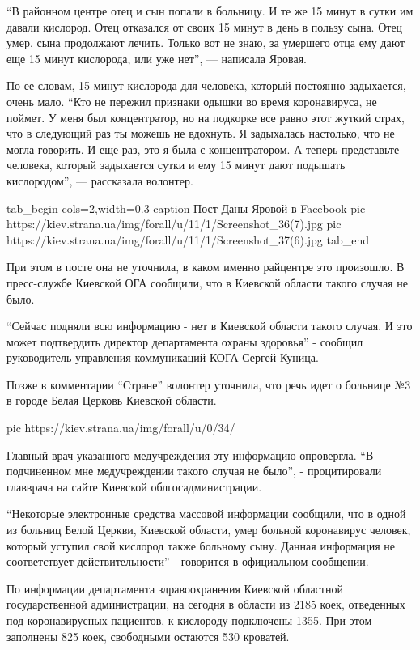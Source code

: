 \enquote{В районном центре отец и сын попали в больницу. И те же 15 минут в сутки
им давали кислород. Отец отказался от своих 15 минут в день в пользу сына.
Отец умер, сына продолжают лечить. Только вот не знаю, за умершего отца
ему дают еще 15 минут кислорода, или уже нет}, --- написала Яровая.

По ее словам, 15 минут кислорода для человека, который постоянно
задыхается, очень мало. \enquote{Кто не пережил признаки одышки во время
коронавируса, не поймет. У меня был концентратор, но на подкорке все равно
этот жуткий страх, что в следующий раз ты можешь не вдохнуть. Я задыхалась
настолько, что не могла говорить. И еще раз, это я была с концентратором.
А теперь представьте человека, который задыхается сутки и ему 15 минут
дают подышать кислородом}, --- рассказала волонтер.

\ifcmt
tab_begin cols=2,width=0.3
  caption Пост Даны Яровой в Facebook
  pic https://kiev.strana.ua/img/forall/u/11/1/Screenshot_36(7).jpg
  pic https://kiev.strana.ua/img/forall/u/11/1/Screenshot_37(6).jpg
tab_end
\fi

При этом в посте она не уточнила, в каком именно райцентре это произошло.
В пресс-службе Киевской ОГА сообщили, что в Киевской области такого случая
не было.

\enquote{Сейчас подняли всю информацию - нет в Киевской области такого случая. И
это может подтвердить директор департамента охраны здоровья} - сообщил
руководитель управления коммуникаций КОГА Сергей Куница.

Позже в комментарии \enquote{Стране} волонтер уточнила, что речь идет о больнице
№3 в городе Белая Церковь Киевской области.

\ifcmt
pic https://kiev.strana.ua/img/forall/u/0/34/%
\fi

Главный врач указанного медучреждения эту информацию опровергла. \enquote{В
подчиненном мне медучреждении такого случая не было}, -  процитировали
главврача на сайте Киевской облгосадминистрации.

\enquote{Некоторые электронные средства массовой информации сообщили, что в одной
из больниц Белой Церкви, Киевской области, умер больной коронавирус
человек, который уступил свой кислород также больному сыну. Данная
информация не соответствует действительности} - говорится в официальном
сообщении.

По информации департамента здравоохранения Киевской областной
государственной администрации, на сегодня в области из 2185 коек,
отведенных под коронавирусных пациентов, к кислороду подключены 1355. При
этом заполнены 825 коек, свободными остаются 530 кроватей.

